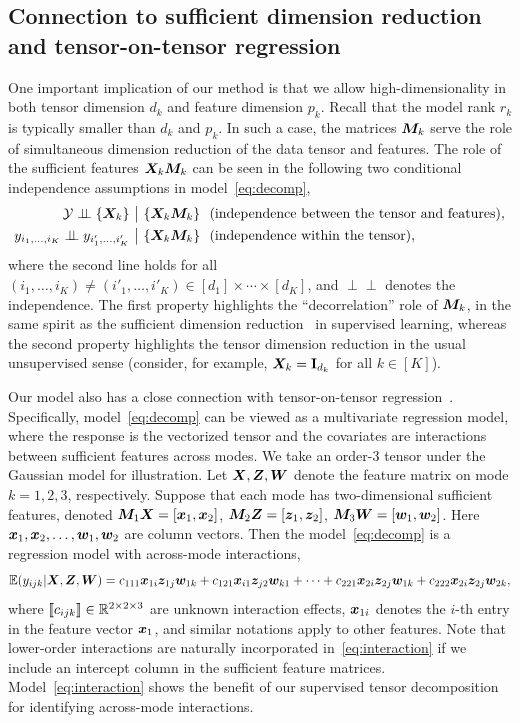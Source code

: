\documentclass[12pt]{article}
\theoremstyle{definition}
\theoremstyle{definition}
\def\ci{\perp\!\!\!\perp}
\begin{document}
\subsection{Connection to sufficient dimension reduction and tensor-on-tensor regression}\label{sec:connection}
One important implication of our method is that we allow high-dimensionality in both tensor dimension $d_k$ and feature dimension $p_k$. Recall that the model rank $r_k$ is typically smaller than $d_k$ and $p_k$. In such a case, the matrices $\bm M_k$ serve the role of simultaneous dimension reduction of the data tensor and features. The role of the sufficient features $\bm X_k\bm M_k$ can be seen in the following two conditional independence assumptions in model~\eqref{eq:decomp},
\begin{align}
\tY \ci \{\mX_k\}&\ \big|\ \{\mX_k\mM_k\} \ \ \text{(independence between the tensor and features)},\\
y_{i_1,\ldots,i_K} \ci y_{i'_1,\ldots,i'_K} & \ \big|\ \{\mX_k\mM_k\}  \ \ \text{(independence within the tensor)},
\end{align}
where the second line holds for all $(i_1,\ldots,i_K)\neq(i'_1,\ldots,i'_K) \in[d_1]\times\cdots\times[d_K]$, and $\ci$ denotes the independence. The first property highlights the ``decorrelation'' role of $\bm M_k$, in the same spirit as the sufficient dimension reduction~\citep{adragni2009sufficient} in supervised learning, whereas the second property highlights the tensor dimension reduction in the usual unsupervised sense (consider, for example, $\bm X_k=\mathbf{I}_{d_k}$ for all $k\in[K]$).

Our model also has a close connection with tensor-on-tensor regression~\citep{raskutti2019convex, lock2018tensor,gahrooei2020multiple,hao2020sparse}. Specifically, model~\eqref{eq:decomp} can be viewed as a multivariate regression model, where the response is the vectorized tensor and the covariates are interactions between sufficient features across modes. We take an order-3 tensor under the Gaussian model for illustration. Let $\bm X,\bm Z,\bm{W}$ denote the feature matrix on mode $k=1, 2, 3$, respectively. Suppose that each mode has two-dimensional sufficient features, denoted $\bm M_1\bm X=[\bm x_1,\bm x_2]$, $\bm M_2\bm Z=[\bm{z}_1,\bm{z}_2]$, $\bm M_3\bm{W}=[\bm{w}_1,\bm{w}_2]$. Here $\bm x_1,\bm x_2,\ldots,\bm{w}_1, \bm{w}_2$ are column vectors. Then the model~\eqref{eq:decomp} is a regression model with across-mode interactions,
\begin{equation}\label{eq:interaction}
\mathbb{E}(y_{ijk}|\bm X,\bm Z,\bm{W})=c_{111}\bm x_{1i}\bm{z}_{1j}\bm{w}_{1k}+c_{121}\bm x_{i1}\bm{z}_{j2}\bm{w}_{k1}+\cdots+c_{221}\bm x_{2i}\bm{z}_{2j}\bm{w}_{1k}+c_{222}\bm x_{2i}\bm{z}_{2j}\bm{w}_{2k},
\end{equation}
where $\llbracket c_{ijk} \rrbracket \in \mathbb{R}^{2\times 2\times 3}$ are unknown interaction effects, $\bm x_{1i}$ denotes the $i$-th entry in the feature vector $\bm x_1$, and similar notations apply to other features. Note that lower-order interactions are naturally incorporated in~\eqref{eq:interaction} if we include an intercept column in the sufficient feature matrices. Model~\eqref{eq:interaction} shows the benefit of our supervised tensor decomposition for identifying across-mode interactions. 
\end{document}
